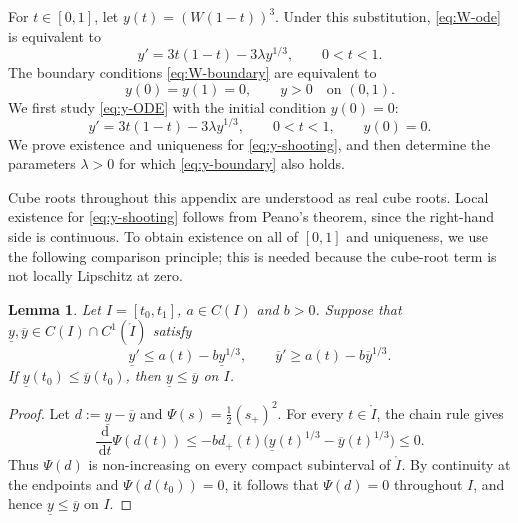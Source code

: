 \documentclass[12pt]{amsart}
\numberwithin{equation}{section}
\theoremstyle{plain}
\newtheorem{lemma}[theorem]{Lemma}
\theoremstyle{definition}
\newcommand{\dd}{\,\mathrm d}
\begin{document}
For $t\in[0,1]$, let $y(t)=(W(1-t))^3$.  Under this substitution,
\eqref{eq:W-ode} is equivalent to
\begin{equation}
 y'=3t(1-t)-3\lambda y^{1/3}, \qquad 0<t<1.
 \label{eq:y-ODE}
\end{equation}
The boundary conditions \eqref{eq:W-boundary} are equivalent to
\begin{equation}
    \label{eq:y-boundary}
 y(0)=y(1)=0, \qquad y>0 \quad\text{on }(0,1).
\end{equation}
We first study \eqref{eq:y-ODE} with the initial condition $y(0)=0$:
\begin{equation}
 y'=3t(1-t)-3\lambda y^{1/3}, \qquad 0<t<1,\qquad y(0)=0.
 \label{eq:y-shooting}
\end{equation}
We prove existence and uniqueness for \eqref{eq:y-shooting}, and then
determine the parameters $\lambda>0$ for which \eqref{eq:y-boundary} also
holds.

Cube roots throughout this appendix are understood as real cube roots.
Local existence for \eqref{eq:y-shooting} follows from Peano's theorem, since
the right-hand side is continuous.  To obtain existence on all of \([0,1]\) and
uniqueness, we use the following comparison principle; this is needed because
the cube-root term is not locally Lipschitz at zero.

\begin{lemma}
\label{lem:cuberoot-comparison}
Let \(I=[t_0,t_1]\), \(a\in C(I)\) and \(b>0\). Suppose that
\(\underline y,\overline y\in C(I)\cap C^1(\mathring{I})\) satisfy
\[
 \underline y'\le a(t)-b\underline y^{1/3},
 \qquad
 \overline y'\ge a(t)-b\overline y^{1/3}.
\]
If
\(\underline y(t_0)\le\overline y(t_0)\), then
\(\underline y\le\overline y\) on \(I\).
\end{lemma}

\begin{proof}
Let \(d:=\underline y-\overline y\) and
\(\Psi(s)=\frac12(s_+)^2\).  For every \(t\in\mathring I\), the chain
rule gives
\[
 \frac{\dd}{\dd t}\Psi(d(t))
 \le -b d_+(t)
 \bigl(\underline y(t)^{1/3}-\overline y(t)^{1/3}\bigr)
 \le 0.
\]
Thus \(\Psi(d)\) is non-increasing on every compact subinterval of
$\mathring I$.  By continuity at the endpoints and
\(\Psi(d(t_0))=0\), it follows that \(\Psi(d)=0\) throughout \(I\), and hence
\(\underline y\le\overline y\) on \(I\).
\end{proof}
\end{document}
